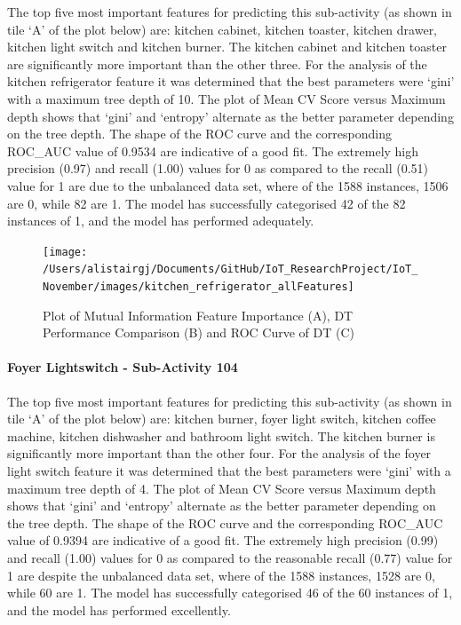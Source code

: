 \documentclass[11pt,]{article}
\let\oldparagraph\paragraph
\renewcommand{\paragraph}[1]{\oldparagraph{#1}\mbox{}}
\begin{document}
The top five most important features for predicting this sub-activity
(as shown in tile `A' of the plot below) are: kitchen cabinet, kitchen
toaster, kitchen drawer, kitchen light switch and kitchen burner. The
kitchen cabinet and kitchen toaster are significantly more important
than the other three. For the analysis of the kitchen refrigerator
feature it was determined that the best parameters were `gini' with a
maximum tree depth of 10. The plot of Mean CV Score versus Maximum depth
shows that `gini' and `entropy' alternate as the better parameter
depending on the tree depth. The shape of the ROC curve and the
corresponding ROC\_AUC value of 0.9534 are indicative of a good fit. The
extremely high precision (0.97) and recall (1.00) values for 0 as
compared to the recall (0.51) value for 1 are due to the unbalanced data
set, where of the 1588 instances, 1506 are 0, while 82 are 1. The model
has successfully categorised 42 of the 82 instances of 1, and the model
has performed adequately.

\begin{figure}[H]

{\centering \texttt{[image: /Users/alistairgj/Documents/GitHub/IoT\_ResearchProject/IoT\_November/images/kitchen\_refrigerator\_allFeatures]} 

}

\caption{Plot of Mutual Information Feature Importance (A), DT Performance Comparison (B) and ROC Curve of DT (C)}\label{fig:unnamed-chunk-14}
\end{figure}

\hypertarget{foyer-lightswitch---sub-activity-104-1}{%
\paragraph{Foyer Lightswitch - Sub-Activity
104}\label{foyer-lightswitch---sub-activity-104-1}}

The top five most important features for predicting this sub-activity
(as shown in tile `A' of the plot below) are: kitchen burner, foyer
light switch, kitchen coffee machine, kitchen dishwasher and bathroom
light switch. The kitchen burner is significantly more important than
the other four. For the analysis of the foyer light switch feature it
was determined that the best parameters were `gini' with a maximum tree
depth of 4. The plot of Mean CV Score versus Maximum depth shows that
`gini' and `entropy' alternate as the better parameter depending on the
tree depth. The shape of the ROC curve and the corresponding ROC\_AUC
value of 0.9394 are indicative of a good fit. The extremely high
precision (0.99) and recall (1.00) values for 0 as compared to the
reasonable recall (0.77) value for 1 are despite the unbalanced data
set, where of the 1588 instances, 1528 are 0, while 60 are 1. The model
has successfully categorised 46 of the 60 instances of 1, and the model
has performed excellently.
\end{document}
